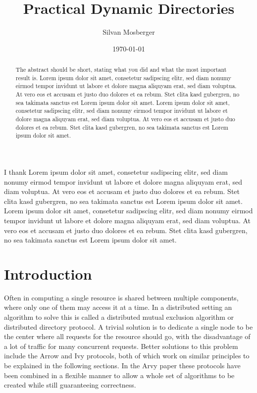 \documentclass[a4paper, oneside]{discothesis}
\title{Practical Dynamic Directories}
\author{Silvan Mosberger}
\institute{Distributed Computing Group \\[2pt]
Computer Engineering and Networks Laboratory \\[2pt]
ETH Zürich}
\date{\today}
\begin{document}
\frontmatter %
\maketitle
{}

\cleardoublepage

\begin{acknowledgements}
I thank Lorem ipsum dolor sit amet, consetetur sadipscing elitr, sed diam nonumy eirmod tempor invidunt ut labore et dolore magna aliquyam erat, sed diam voluptua. At vero eos et accusam et justo duo dolores et ea rebum. Stet clita kasd gubergren, no sea takimata sanctus est Lorem ipsum dolor sit amet. Lorem ipsum dolor sit amet, consetetur sadipscing elitr, sed diam nonumy eirmod tempor invidunt ut labore et dolore magna aliquyam erat, sed diam voluptua. At vero eos et accusam et justo duo dolores et ea rebum. Stet clita kasd gubergren, no sea takimata sanctus est Lorem ipsum dolor sit amet.
\end{acknowledgements}


\begin{abstract}
The abstract should be short, stating what you did and what the most important result is.
Lorem ipsum dolor sit amet, consetetur sadipscing elitr, sed diam nonumy eirmod tempor invidunt ut labore et dolore magna aliquyam erat, sed diam voluptua. At vero eos et accusam et justo duo dolores et ea rebum. Stet clita kasd gubergren, no sea takimata sanctus est Lorem ipsum dolor sit amet. Lorem ipsum dolor sit amet, consetetur sadipscing elitr, sed diam nonumy eirmod tempor invidunt ut labore et dolore magna aliquyam erat, sed diam voluptua. At vero eos et accusam et justo duo dolores et ea rebum. Stet clita kasd gubergren, no sea takimata sanctus est Lorem ipsum dolor sit amet.
\end{abstract}

\tableofcontents

\mainmatter

\chapter{Introduction}

Often in computing a single resource is shared between multiple components, where only one of them may access it at a time. In a distributed setting an algorithm to solve this is called a distributed mutual exclusion algorithm or distributed directory protocol. A trivial solution is to dedicate a single node to be the center where all requests for the resource should go, with the disadvantage of a lot of traffic for many concurrent requests. Better solutions to this problem include the Arrow and Ivy protocols, both of which work on similar principles to be explained in the following sections. In the Arvy paper these protocols have been combined in a flexible manner to allow a whole set of algorithms to be created while still guaranteeing correctness.
\end{document}

